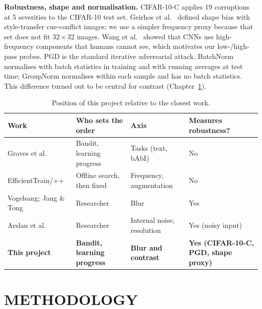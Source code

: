 \documentclass[a4paper,12pt]{report}
\begin{document}
\textbf{Robustness, shape and normalisation.} CIFAR-10-C \cite{hendrycks2019} applies 19 corruptions at 5 severities to the CIFAR-10 test set. Geirhos et al.\ \cite{geirhos2019} defined shape bias with style-transfer cue-conflict images; we use a simpler frequency proxy because that set does not fit $32\times32$ images. Wang et al.\ \cite{wang2020highfreq} showed that CNNs use high-frequency components that humans cannot see, which motivates our low-/high-pass probes. PGD \cite{madry2018} is the standard iterative adversarial attack. BatchNorm \cite{ioffe2015} normalises with batch statistics in training and with running averages at test time; GroupNorm \cite{wu2018gn} normalises within each sample and has no batch statistics. This difference turned out to be central for contrast (Chapter~\ref{ch:method}).

\begin{table}[htbp]
\caption{Position of this project relative to the closest work.}
\label{tab:related}
\begin{center}
\footnotesize
\begin{tabular}{|P{3.4cm}|P{3.2cm}|P{3.4cm}|P{3.6cm}|} \hline
\textbf{Work} & \textbf{Who sets the order} & \textbf{Axis} & \textbf{Measures robustness?} \\ \hline
Graves et al.\ \cite{graves2017} & Bandit, learning progress & Tasks (text, bAbI) & No \\ \hline
EfficientTrain/++ \cite{wang2023efficienttrain,wang2024efficienttrainpp} & Offline search, then fixed & Frequency, augmentation & No \\ \hline
Vogelsang; Jang \& Tong \cite{vogelsang2018,jang2021blurry,jang2024blur} & Researcher & Blur & Yes \\ \hline
Arslan et al.\ \cite{arslan2024noise} & Researcher & Internal noise, resolution & Yes (noisy input) \\ \hline
\textbf{This project} & \textbf{Bandit, learning progress} & \textbf{Blur and contrast} & \textbf{Yes (CIFAR-10-C, PGD, shape proxy)} \\ \hline
\end{tabular}
\end{center}
\end{table}

\chapter{METHODOLOGY}
\label{ch:method}
\end{document}
